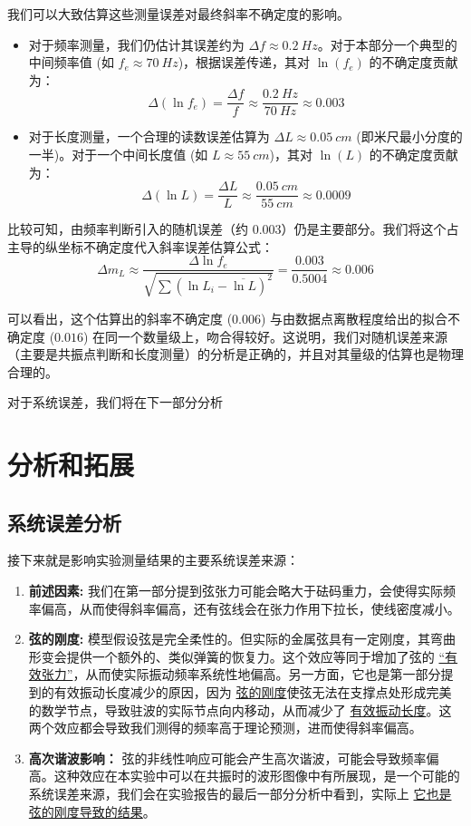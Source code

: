 \documentclass[10pt,twocolumn]{article}
\begin{document}
\par
我们可以大致估算这些测量误差对最终斜率不确定度的影响。
\begin{itemize}
    \item 对于频率测量，我们仍估计其误差约为 $\Delta f \approx \SI{0.2}{Hz}$。对于本部分一个典型的中间频率值 (如 $f_e \approx \SI{70}{Hz}$)，根据误差传递，其对 $\ln(f_e)$ 的不确定度贡献为：
    $$ \Delta(\ln f_e) = \frac{\Delta f}{f} \approx \frac{\SI{0.2}{Hz}}{\SI{70}{Hz}} \approx 0.003 $$
    
    \item 对于长度测量，一个合理的读数误差估算为 $\Delta L \approx \SI{0.05}{cm}$ (即米尺最小分度的一半)。对于一个中间长度值 (如 $L \approx \SI{55}{cm}$)，其对 $\ln(L)$ 的不确定度贡献为：
    $$ \Delta(\ln L) = \frac{\Delta L}{L} \approx \frac{\SI{0.05}{cm}}{\SI{55}{cm}} \approx 0.0009 $$
\end{itemize}
比较可知，由频率判断引入的随机误差（约 $0.003$）仍是主要部分。我们将这个占主导的纵坐标不确定度代入斜率误差估算公式：
$$ \Delta m_L \approx \frac{\Delta \ln f_e}{\sqrt{\sum (\ln L_i - \overline{\ln L})^2}} = \frac{0.003}{0.5004} \approx 0.006 $$
\par
可以看出，这个估算出的斜率不确定度 ($0.006$) 与由数据点离散程度给出的拟合不确定度 ($0.016$) 在同一个数量级上，吻合得较好。这说明，我们对随机误差来源（主要是共振点判断和长度测量）的分析是正确的，并且对其量级的估算也是物理合理的。
\par
对于系统误差，我们将在下一部分分析
\section{分析和拓展}
\subsection{系统误差分析}
接下来就是影响实验测量结果的主要系统误差来源：

\begin{enumerate}
    \item \textbf{前述因素:} 我们在第一部分提到弦张力可能会略大于砝码重力，会使得实际频率偏高，从而使得斜率偏高，还有弦线会在张力作用下拉长，使线密度减小。

    \item \textbf{弦的刚度:} 模型假设弦是完全柔性的。但实际的金属弦具有一定刚度，其弯曲形变会提供一个额外的、类似弹簧的恢复力。这个效应等同于增加了弦的 \underline{“有效张力”}，从而使实际振动频率系统性地偏高。另一方面，它也是第一部分提到的有效振动长度减少的原因，因为 \underline{弦的刚度}使弦无法在支撑点处形成完美的数学节点，导致驻波的实际节点向内移动，从而减少了 \underline{有效振动长度}。这两个效应都会导致我们测得的频率高于理论预测，进而使得斜率偏高。

    \item \textbf{高次谐波影响：} 弦的非线性响应可能会产生高次谐波，可能会导致频率偏高。这种效应在本实验中可以在共振时的波形图像中有所展现，是一个可能的系统误差来源，我们会在实验报告的最后一部分分析中看到，实际上 \underline{它也是弦的刚度导致的结果}。
\end{enumerate}
\end{document}
